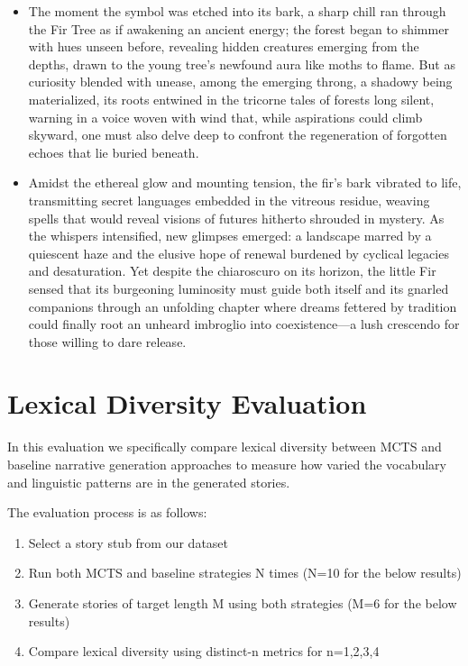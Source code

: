 \documentclass[11pt]{article}
\begin{document}
\begin{small}
\begin{itemize}
    \item The moment the symbol was etched into its bark, a sharp chill ran through the Fir Tree as if 
    awakening an ancient energy; the forest began to shimmer with hues unseen before, revealing hidden 
    creatures emerging from the depths, drawn to the young tree's newfound aura like moths to flame. But 
    as curiosity blended with unease, among the emerging throng, a shadowy being materialized, its roots 
    entwined in the tricorne tales of forests long silent, warning in a voice woven with wind that, while 
    aspirations could climb skyward, one must also delve deep to confront the regeneration of forgotten 
    echoes that lie buried beneath.

    \item Amidst the ethereal glow and mounting tension, the fir's bark vibrated to life, transmitting 
    secret languages embedded in the vitreous residue, weaving spells that would reveal visions of futures 
    hitherto shrouded in mystery. As the whispers intensified, new glimpses emerged: a landscape marred 
    by a quiescent haze and the elusive hope of renewal burdened by cyclical legacies and desaturation. 
    Yet despite the chiaroscuro on its horizon, the little Fir sensed that its burgeoning luminosity must 
    guide both itself and its gnarled companions through an unfolding chapter where dreams fettered by 
    tradition could finally root an unheard imbroglio into coexistence—a lush crescendo for those willing 
    to dare release.
\end{itemize}
\end{small}

\section{Lexical Diversity Evaluation}
\label{appendix:diversity-results}

In this evaluation we specifically compare lexical diversity between MCTS and baseline narrative generation approaches to measure how varied the vocabulary and linguistic patterns are in the generated stories.

\bigskip
\noindent 
The evaluation process is as follows:

\begin{enumerate}
    \item Select a story stub from our dataset
    \item Run both MCTS and baseline strategies N times (N=10 for the below results)
    \item Generate stories of target length M using both strategies (M=6 for the below results)
    \item Compare lexical diversity using distinct-n metrics for n=1,2,3,4
\end{enumerate}
\end{document}
